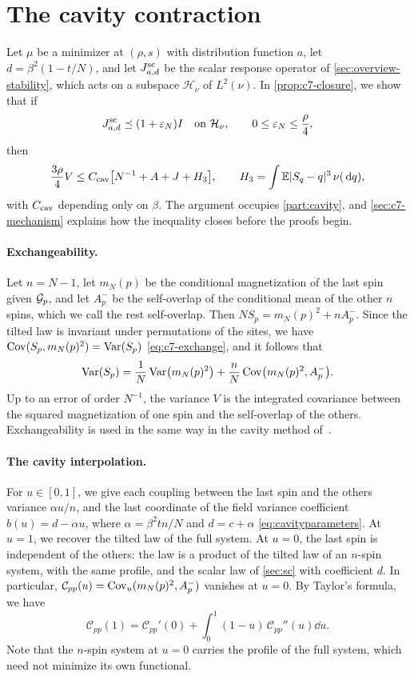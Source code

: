 \section{The cavity contraction}\label{sec:overview-cavity}

Let $\mu$ be a minimizer at $(\rho,s)$ with distribution function $a$,
let $d=\beta^2(1-t/N)$, and let $J^{\mathrm{sc}}_{a,d}$ be the scalar response
operator of \cref{sec:overview-stability}, which acts on a subspace
$\mathcal H_\nu$ of $L^2(\nu)$. In \cref{prop:c7-closure}, we show that
if
\begin{equation}\label{eq:ov-stability}
 J^{\mathrm{sc}}_{a,d}\preceq(1+\varepsilon_N)I\quad\text{on }\mathcal H_\nu,
 \qquad 0\le\varepsilon_N\le\frac\rho4,
\end{equation}
then
\[
 \frac{3\rho}4V\le C_{\rm cav}\bigl[N^{-1}+A+J+H_3\bigr],\qquad
 H_3=\int\mathbb E|S_q-q|^3\,\nu(\,\mathrm d q),
\]
with $C_{\rm cav}$ depending only on $\beta$. The argument occupies
\cref{part:cavity}, and \cref{sec:c7-mechanism} explains how the
inequality closes before the proofs begin.

\paragraph{Exchangeability.}
Let $n=N-1$, let $m_N(p)$ be the conditional magnetization of the last
spin given $\mathcal G_p$, and let $A^-_p$ be the self-overlap of the
conditional mean of the other $n$ spins, which we call the rest
self-overlap. Then $NS_p=m_N(p)^2+nA^-_p$. Since the tilted law is
invariant under permutations of the sites, we have
$\operatorname{Cov}(S_p,m_N(p)^2)=\operatorname{Var}(S_p)$ \eqref{eq:c7-exchange}, and it follows
that
\[
 \operatorname{Var}(S_p)=\frac1N\operatorname{Var}\bigl(m_N(p)^2\bigr)
 +\frac nN\operatorname{Cov}\bigl(m_N(p)^2,A^-_p\bigr).
\]
Up to an error of order $N^{-1}$, the variance $V$ is the integrated
covariance between the squared magnetization of one spin and the
self-overlap of the others. Exchangeability is used in the same way in
the cavity method of~\cite[Section~1.6]{TalagrandVolI2011}.

\paragraph{The cavity interpolation.}
For $u\in[0,1]$, we give each coupling between the last spin and the
others variance $\alpha u/n$, and the last coordinate of the field
variance coefficient $b(u)=d-\alpha u$, where $\alpha=\beta^2tn/N$ and
$d=c+\alpha$ \eqref{eq:cavityparameters}. At $u=1$, we recover the
tilted law of the full system. At $u=0$, the last spin is independent
of the others: the law is a product of the tilted law of an $n$-spin
system, with the same profile, and the scalar law of \cref{sec:sc} with
coefficient $d$. In particular,
$\mathcal C_{pp}(u)=\operatorname{Cov}_u(m_N(p)^2,A^-_p)$ vanishes at $u=0$. By Taylor's formula, we
have
\[
 \mathcal C_{pp}(1)=\mathcal C_{pp}'(0)
 +\int_0^1(1-u)\,\mathcal C_{pp}''(u)\dd u .
\]
Note that the $n$-spin system at $u=0$ carries the profile of the full
system, which need not minimize its own functional.

